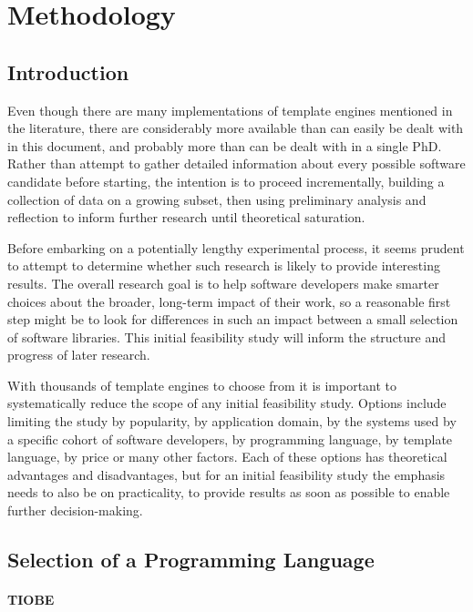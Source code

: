 \section{Methodology}
\label{section:feasibility methodology}


\subsection{Introduction}


Even though there are many implementations of template engines mentioned in the literature, there are considerably more available than can easily be dealt with in this document, and probably more than can be dealt with in a single PhD. Rather than attempt to gather detailed information about every possible software candidate before starting, the intention is to proceed incrementally, building a collection of data on a growing subset, then using preliminary analysis and reflection to inform further research until theoretical saturation.

Before embarking on a potentially lengthy experimental process, it seems prudent to attempt to determine whether such research is likely to provide interesting results. The overall research goal is to help software developers make smarter choices about the broader, long-term impact of their work, so a reasonable first step might be to look for differences in such an impact between a small selection of software libraries. This initial feasibility study will inform the structure and progress of later research.

With thousands of template engines to choose from it is important to systematically reduce the scope of any initial feasibility study. Options include limiting the study by popularity, by application domain, by the systems used by a specific cohort of software developers, by programming language, by template language, by price or many other factors. Each of these options has theoretical advantages and disadvantages, but for an initial feasibility study the emphasis needs to also be on practicality, to provide results as soon as possible to enable further decision-making.

\subsection{Selection of a Programming Language}
\paragraph{TIOBE}
